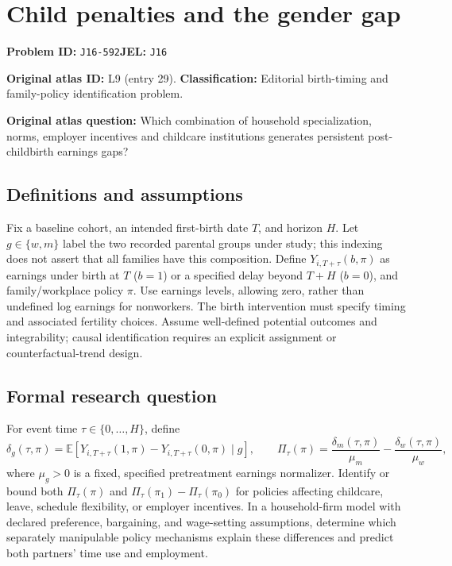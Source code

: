 \documentclass[11pt,a4paper]{article}
\begin{document}
\section*{Child penalties and the gender gap}
\textbf{Problem ID:} \texttt{J16-592}\quad \textbf{JEL:} \texttt{J16}\par
\label{problem:OP-0029}
\label{atlas:prob:L9}
\noindent\textbf{Original atlas ID:} L9 (entry 29). \textbf{Classification:} Editorial birth-timing and family-policy identification problem.

\noindent\textbf{Original atlas question:} Which combination of household specialization, norms, employer incentives and childcare institutions generates persistent post-childbirth earnings gaps?

\subsection*{Definitions and assumptions}
Fix a baseline cohort, an intended first-birth date $T$, and horizon $H$. Let $g\in\{w,m\}$ label the two recorded parental groups under study; this indexing does not assert that all families have this composition. Define $Y_{i,T+\tau}(b,\pi)$ as earnings under birth at $T$ ($b=1$) or a specified delay beyond $T+H$ ($b=0$), and family/workplace policy $\pi$. Use earnings levels, allowing zero, rather than undefined log earnings for nonworkers. The birth intervention must specify timing and associated fertility choices. Assume well-defined potential outcomes and integrability; causal identification requires an explicit assignment or counterfactual-trend design.
\subsection*{Formal research question}
For event time $\tau\in\{0,\ldots,H\}$, define
\[
 \delta_g(\tau,\pi)=\mathbb E[Y_{i,T+\tau}(1,\pi)-Y_{i,T+\tau}(0,\pi)\mid g],
 \qquad
 \Pi_\tau(\pi)=\frac{\delta_m(\tau,\pi)}{\mu_m}
                 -\frac{\delta_w(\tau,\pi)}{\mu_w},
\]
where $\mu_g>0$ is a fixed, specified pretreatment earnings normalizer. Identify or bound both $\Pi_\tau(\pi)$ and $\Pi_\tau(\pi_1)-\Pi_\tau(\pi_0)$ for policies affecting childcare, leave, schedule flexibility, or employer incentives. In a household-firm model with declared preference, bargaining, and wage-setting assumptions, determine which separately manipulable policy mechanisms explain these differences and predict both partners' time use and employment.
\end{document}

